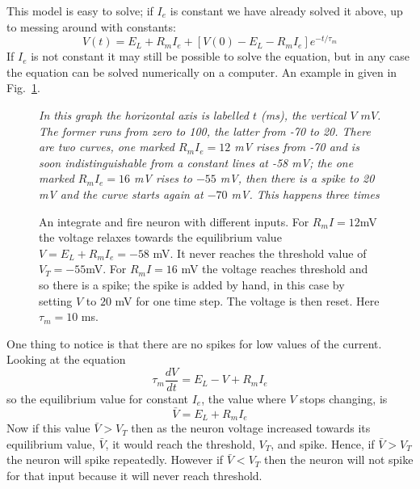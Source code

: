 \documentclass[12pt]{article}
\begin{document}
This model is easy to solve; if $I_e$ is constant we have already
solved it above, up to messing around with constants:
\begin{equation}
V(t)=E_L+R_mI_e+[V(0)-E_L-R_mI_e]e^{-t/\tau_m}
\end{equation}
If $I_e$ is not
constant it may still be possible to solve the equation, but in any
case the equation can be solved numerically on a computer. An example
in given in Fig.~\ref{v_i_f}.

\begin{figure}
  \begin{center}
    {\textsl{In this graph the horizontal axis is labelled $t$ (ms), the vertical $V$ $mV$. The former runs from zero to 100, the latter from -70 to 20. There are two curves, one marked $R_mI_e=12$ mV rises from -70 and is soon indistinguishable from a constant lines at -58 mV; the one marked $R_mI_e=16$ mV rises to $-55$ mV, then there is a spike to 20 mV and the curve starts again at $-70$ mV. This happens three times}}
{  
 } 
\end{center}
\caption{An integrate and fire neuron with different inputs. For
  $R_mI=12 $mV the voltage relaxes towards the equilibrium value
  $V=E_L+R_mI_e=-58$ mV. It never reaches the threshold value of
  $V_T=-55 $mV. For $R_mI=16$ mV the voltage reaches threshold and so
  there is a spike; the spike is added by hand, in this case by
  setting $V$ to $20$ mV for one time step. The voltage is then
  reset. Here $\tau_m=10$ ms.\label{v_i_f}}
\end{figure}

One thing to notice is that there are no spikes for low values of the current. Looking at the equation 
\begin{equation}
\tau_m\frac{dV}{dt}=E_L-V+R_mI_e
\end{equation}
so the equilibrium value for constant $I_e$, the value where $V$ stops changing, is
\begin{equation}
\bar{V}=E_L+R_mI_e
\end{equation}
Now if this value $\bar{V}>V_T$ then as the neuron voltage increased
towards its equilibrium value, $\bar{V}$, it would reach the
threshold, $V_T$, and spike. Hence, if $\bar{V}>V_T$ the neuron will
spike repeatedly.  However if $\bar{V}<V_T$ then the neuron will not
spike for that input because it will never reach threshold. 
\end{document}
